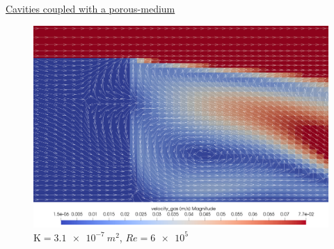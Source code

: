 \documentclass{beamer}
\begin{document}
\begin{frame}{\hyperlink{coupledSupp}{Cavities coupled with a porous-medium}}
\begin{figure}
	\centering
	\includegraphics[height=0.82\textheight]{coupled_second_cavity.png}
	\caption{\tiny $\mathrm{K}=\SI{3.1e-7}{m^2}$, $Re=\num{6e5}$}
\end{figure}
\end{frame}
\end{document}
